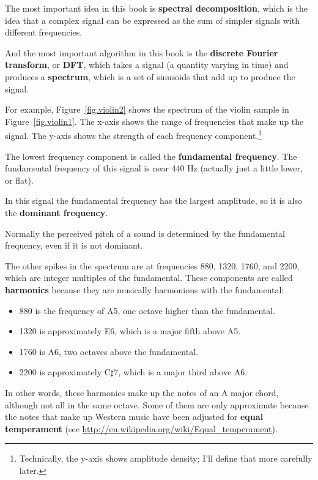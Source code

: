 \documentclass[12pt]{book}
\begin{document}
The most important idea in this book is {\bf spectral decomposition},
which is the idea that a complex signal can be expressed as the sum of
simpler signals with different frequencies.

And the most important algorithm in this book is the {\bf discrete
  Fourier transform}, or {\bf DFT}, which takes a signal (a quantity
varying in time) and produces a {\bf spectrum}, which is a set of
sinusoids that add up to produce the signal.

For example, Figure~\ref{fig.violin2} shows the spectrum of the violin
sample in Figure~\ref{fig.violin1}.  The x-axis shows the range of
frequencies that make up the signal.  The y-axis shows the strength of
each frequency component.\footnote{Technically, the y-axis shows
  amplitude density; I'll define that more carefully later.}

The lowest frequency component is called the {\bf fundamental
  frequency}.  The fundamental frequency of this signal is near 440 Hz
(actually just a little lower, or flat).

In this signal the fundamental frequency has the largest amplitude,
so it is also the {\bf dominant frequency}.

Normally the perceived pitch of a sound is determined by the
fundamental frequency, even if it is not dominant. 

The other spikes in the spectrum are at frequencies 880, 1320, 1760, and
2200, which are integer multiples of the fundamental.
These components are called {\bf harmonics} because they are
musically harmonious with the fundamental:

\begin{itemize}

\item 880 is the frequency of
A5, one octave higher than the fundamental.  

\item 1320 is approximately E6, which is a major fifth above A5.

\item 1760 is A6, two octaves above the fundamental. 

\item 2200 is approximately C$\sharp$7, which is a major third
above A6.

\end{itemize}

In other words, these harmonics make up the notes of an A major
chord, although not all in the same octave.  Some of them are only
approximate because the notes that make up Western music have been
adjusted for {\bf equal temperament} (see
 \url{http://en.wikipedia.org/wiki/Equal_temperament}).
\end{document}
